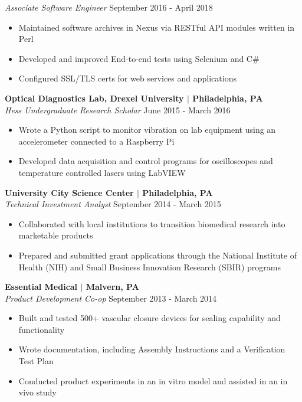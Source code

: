\documentclass[line,resmargin,11pt]{res}
\begin{document}
\begin{resume}
{\sl Associate Software Engineer} \hfill September 2016 - April 2018
	\begin{itemize}  \itemsep -2pt %
		\item Maintained software archives in Nexus via RESTful API modules written in Perl
		\item Developed and improved End-to-end tests using Selenium and C\#
		\item Configured SSL/TLS certs for web services and applications
	\end{itemize}
                
\textbf{Optical Diagnostics Lab, Drexel University $|$ Philadelphia, PA} \\
{\sl Hess Undergraduate Research Scholar} \hfill June 2015 - March 2016
	\begin{itemize}  \itemsep -2pt %
		\item  Wrote a Python script to monitor vibration on lab equipment using an accelerometer connected to a Raspberry Pi
		\item  Developed data acquisition and control programs for oscilloscopes and temperature controlled lasers using LabVIEW
	\end{itemize}
				
\textbf{University City Science Center $|$ Philadelphia, PA} \\
{\sl Technical Investment Analyst} \hfill September 2014 - March 2015 
	\begin{itemize} \itemsep -2pt
		\item  Collaborated with local institutions to transition biomedical research into marketable products
		\item  Prepared and submitted grant applications through the National Institute of Health (NIH) and Small Business Innovation Research (SBIR) programs
	\end{itemize}
				
\textbf{Essential Medical $|$ Malvern, PA} \\
{\sl Product Development Co-op} \hfill September 2013 - March 2014
	\begin{itemize} \itemsep -2pt
		\item  Built and tested 500+ vascular closure devices for sealing capability and functionality
		\item  Wrote documentation, including Assembly Instructions and a Verification Test Plan
		\item  Conducted product experiments in an in vitro model and assisted in an in vivo study
	\end{itemize}
				

\end{resume}
\end{document}
